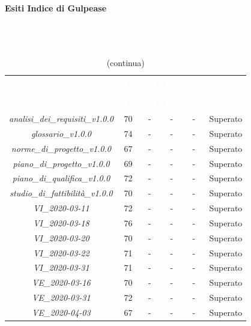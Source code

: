 \paragraph{Esiti Indice di Gulpease} \mbox{} \\ \mbox{} \\
\begin{longtable}{c c c c c c}
\rowcolor{white}\caption{Esiti verifica documenti con Indice di Gulpease} \\
		\rowcolor{redafk}
\textcolor{white}{\textbf{Documento}} &
\textcolor{white}{\textbf{An}} &
\textcolor{white}{\textbf{TB}} &
\textcolor{white}{\textbf{PB}} &
\textcolor{white}{\textbf{VC}} &
\textcolor{white}{\textbf{Esito}} \\
		\endfirsthead
		\rowcolor{white}\caption[]{(continua)} \\
		\rowcolor{redafk}
\textcolor{white}{\textbf{Documento}} &
\textcolor{white}{\textbf{An}} &
\textcolor{white}{\textbf{TB}} &
\textcolor{white}{\textbf{PB}} &
\textcolor{white}{\textbf{VC}} &
\textcolor{white}{\textbf{Esito}} \\
		\endhead
		\textit{analisi\_dei\_requisiti\_v1.0.0} & 70 & - & - & - & Superato \\
		\textit{glossario\_v1.0.0} & 74 & - & - & - & Superato \\
		\textit{norme\_di\_progetto\_v1.0.0} & 67 & - & - & - & Superato \\
		\textit{piano\_di\_progetto\_v1.0.0} & 69 & - & - & - & Superato \\
		\textit{piano\_di\_qualifica\_v1.0.0} & 72 & - & - & - & Superato \\
		\textit{studio\_di\_fattibilità\_v1.0.0} & 70 & - & - & - & Superato \\
		\textit{VI\_2020-03-11} & 72 & - & - & - & Superato \\
		\textit{VI\_2020-03-18} & 76 & - & - & - & Superato \\
		\textit{VI\_2020-03-20} & 70 & - & - & - & Superato \\
		\textit{VI\_2020-03-22} & 71 & - & - & - & Superato \\
		\textit{VI\_2020-03-31} & 71 & - & - & - & Superato \\
		\textit{VE\_2020-03-16} & 70 & - & - & - & Superato \\
		\textit{VE\_2020-03-31} & 72 & - & - & - & Superato \\
		\textit{VE\_2020-04-03} & 67 & - & - & - & Superato \\
\end{longtable}

